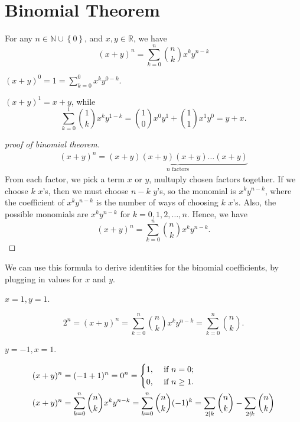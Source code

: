 \section{Binomial Theorem}
\begin{theorem} \label{thm: binomial theorem}
    For any \(n \in \mathbb{N} \cup \left\{ 0 \right\} \), and \(x, y \in \mathbb{R} \), we have 
    \[
        (x + y)^n = \sum_{k=0}^n \binom{n}{k} x^k y^{n-k} 
    \]  
\end{theorem}
\begin{eg}
    \((x+y)^0 = 1 = \sum_{k=0} ^0 x^k y^{0-k}\). 
\end{eg}

\begin{eg}
    \((x + y)^1 = x+y\), while 
    \[
        \sum_{k=0}^1 \binom{1}{k}x^k y^{1-k} = \binom{1}{0}x^0 y^1 + \binom{1}{1} x^1 y^0 = y + x . 
    \] 
\end{eg}

\begin{proof}[proof of binomial theorem]
\begin{align*}
    (x + y)^n = \underbrace{(x+y)(x+y)(x+y) \dots (x+y)}_{n \text{ factors}}
\end{align*}
From each factor, we pick a term \(x\) or \(y\), multuply chosen factors together. If we choose \(k\) \(x\)'s, then we must choose \(n - k\) \(y\)'s, so the monomial is \(x^k y^{n-k}\), where the coefficient of \(x^k y^{n-k}\) is the number of ways of choosing \(k\) \(x\)'s. Also, the possible monomials are \(x^k y^{n-k}\) for \(k=0,1,2,\dots ,n\). Hence, we have 
\[
    (x + y)^n = \sum_{k=0}^n \binom{n}{k} x^k y^{n-k}. 
\]            
\end{proof}

We can use this formula to derive identities for the binomial coefficients, by plugging in values for \(x\) and \(y\). 

\begin{eg}
    \(x = 1, y = 1\). 
\end{eg}
\begin{explanation}
    \[
        2^n = (x + y)^n = \sum_{k=0}^n \binom{n}{k}x^k y^{n-k} = \sum_{k=0}^n \binom{n}{k}. 
    \]
\end{explanation}

\begin{eg}
    \(y = -1, x = 1\).  
\end{eg}
\begin{explanation}
    \begin{align*}
        (x + y) ^n &= (-1 + 1)^n = 0^n = \begin{dcases}
           1 , &\text{ if } n=0 ;\\
           0 , &\text{ if } n \ge 1.
        \end{dcases} \\
        (x+y)^n &= \sum_{k=0}^n \binom{n}{k} x^k y^{n-k} = \sum_{k=0}^n \binom{n}{k} (-1)^k = \sum_{2 \mid k} \binom{n}{k} - \sum_{2 \nmid k} \binom{n}{k}    
    \end{align*}
\end{explanation}

